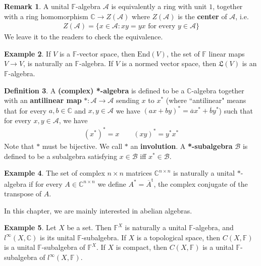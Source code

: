 \documentclass[12pt,b5paper,notitlepage]{article}
\theoremstyle{definition}
\newtheorem{df}{Definition}[section]
\newtheorem{eg}[df]{Example}
\newtheorem{rem}[df]{Remark}
\theoremstyle{plain}
\newcommand{\fk}{\mathfrak}
\newcommand{\ovl}{\overline}
\newcommand{\tr}{\mathrm{t}} %
\newcommand{\End}{\mathrm{End}} %
\newcommand{\scr}{\mathscr}
\newcommand{\Cbb}{\mathbb C}
\newcommand{\Fbb}{\mathbb F}
\numberwithin{equation}{section}
\begin{document}
\begin{rem}
A unital $\Fbb$-algebra $\scr A$ is equivalently a ring with unit $1$, together with a ring homomorphism $\Cbb\rightarrow Z(\scr A)$ where $Z(\scr A)$ is the \textbf{center} of $\scr A$, i.e.
\begin{align*}
Z(\scr A)=\{x\in\scr A:xy=yx\text{ for every }y\in\scr A\}
\end{align*}
We leave it to the readers to check the equivalence.
\end{rem}


\begin{eg}
If $V$ is a $\Fbb$-vector space, then $\End(V)$, the set of $\Fbb$ linear maps $V\rightarrow V$, is naturally an $\Fbb$-algebra. If $V$ is a normed vector space, then $\fk L(V)$ is an $\Fbb$-algebra.
\end{eg}

\begin{df}
A \textbf{(complex) *-algebra}  is defined to be a $\Cbb$-algebra together with an \textbf{antilinear map}  $*:\scr A\rightarrow\scr A$ sending $x$ to $x^*$ (where ``antilinear" means that for every $a,b\in\Cbb$ and $x,y\in\scr A$ we have $(ax+by)^*=\ovl ax^*+\ovl by^*$) such that for every $x,y\in\scr A$, we have
\begin{align*}
(x^*)^*=x\qquad (xy)^*=y^*x^*
\end{align*}
Note that $*$ must be bijective. We call $*$ an \textbf{involution}. 
 A \textbf{*-subalgebra}  $\scr B$ is defined to be a subalgebra satisfying $x\in\scr B$ iff $x^*\in\scr B$.
\end{df}


\begin{eg}
The set of complex $n\times n$ matrices $\Cbb^{n\times n}$ is naturally a unital $*$-algebra if for every $A\in\Cbb^{n\times n}$ we define $A^*=\ovl A^\tr$, the complex conjugate of the transpose of $A$.
\end{eg}

In this chapter, we are mainly interested in abelian algebras.

\begin{eg}
Let $X$ be a set. Then $\Fbb^X$ is naturally a unital $\Fbb$-algebra, and $l^\infty(X,\Cbb)$ is its unital $\Fbb$-subalgebra. If $X$ is a topological space, then $C(X,\Fbb)$ is a unital $\Fbb$-subalgebra of $\Fbb^X$. If $X$ is compact, then $C(X,\Fbb)$ is a unital $\Fbb$-subalgebra of $l^\infty(X,\Fbb)$.
\end{eg}
\end{document}
